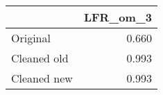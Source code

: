 \begin{tabular}{lr}
\toprule
{} & LFR_om_3 \\
\midrule
Original    &    0.660 \\
Cleaned old &    0.993 \\
Cleaned new &    0.993 \\
\bottomrule
\end{tabular}
